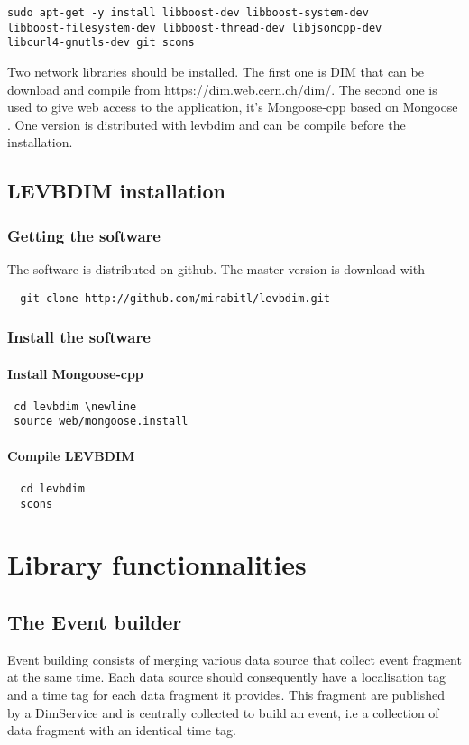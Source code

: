 \documentclass[11pt]{article}
\begin{document}
\begin{verbatim}
sudo apt-get -y install libboost-dev libboost-system-dev 
libboost-filesystem-dev libboost-thread-dev libjsoncpp-dev 
libcurl4-gnutls-dev git scons

\end{verbatim}
Two network libraries should be installed. The first one is DIM that can be download and compile from https://dim.web.cern.ch/dim/. The second one is used to give web access to the application, it's Mongoose-cpp\cite{mongoose-cpp} based on Mongoose \cite{mongoose}. One version is distributed with levbdim and can be compile before the installation.

\subsection{LEVBDIM installation}
\subsubsection{Getting the software}
The software is distributed on github\cite{github}. The master version is download with
 \begin{verbatim}
  git clone http://github.com/mirabitl/levbdim.git
\end{verbatim}
\subsubsection{Install the software}
\paragraph{Install Mongoose-cpp}
\begin{verbatim}
 cd levbdim \newline
 source web/mongoose.install
\end{verbatim}


\paragraph{Compile LEVBDIM}

\begin{verbatim}
  cd levbdim
  scons 
\end{verbatim}

\section{Library functionnalities}
\subsection{The Event builder}
Event building consists of merging various data source that collect event fragment at the same time. Each data source should consequently have a localisation tag and a time tag for each data fragment it provides. This fragment are published by a DimService and is centrally collected to build an event, i.e a collection of data fragment with an identical time tag.
\end{document}

